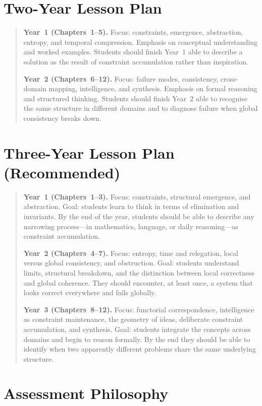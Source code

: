 \documentclass[11pt]{book}
\theoremstyle{plain}
\theoremstyle{definition}
\theoremstyle{remark}
\newenvironment{lessonplan}
  {\begin{quote}\small}
  {\end{quote}}
\begin{document}
\section*{Two-Year Lesson Plan}

\begin{lessonplan}
\textbf{Year~1 (Chapters~1--5).}
Focus: constraints, emergence, abstraction, entropy, and temporal
compression. Emphasis on conceptual understanding and worked examples.
Students should finish Year~1 able to describe a solution as the result
of constraint accumulation rather than inspiration.

\textbf{Year~2 (Chapters~6--12).}
Focus: failure modes, consistency, cross-domain mapping, intelligence,
and synthesis. Emphasis on formal reasoning and structured thinking.
Students should finish Year~2 able to recognise the same structure in
different domains and to diagnose failure when global consistency breaks
down.
\end{lessonplan}

\section*{Three-Year Lesson Plan (Recommended)}

\begin{lessonplan}
\textbf{Year~1 (Chapters~1--3).}
Focus: constraints, structural emergence, and abstraction. Goal:
students learn to think in terms of elimination and invariants. By the
end of the year, students should be able to describe any narrowing
process---in mathematics, language, or daily reasoning---as constraint
accumulation.

\textbf{Year~2 (Chapters~4--7).}
Focus: entropy, time and relegation, local versus global consistency,
and obstruction. Goal: students understand limits, structural breakdown,
and the distinction between local correctness and global coherence. They
should encounter, at least once, a system that looks correct everywhere
and fails globally.

\textbf{Year~3 (Chapters~8--12).}
Focus: functorial correspondence, intelligence as constraint maintenance,
the geometry of ideas, deliberate constraint accumulation, and synthesis.
Goal: students integrate the concepts across domains and begin to reason
formally. By the end they should be able to identify when two apparently
different problems share the same underlying structure.
\end{lessonplan}

\section*{Assessment Philosophy}
\end{document}
